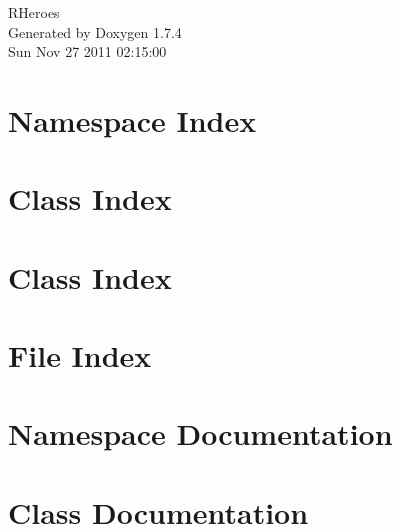 \documentclass[a4paper]{book}
\begin{document}
\hypersetup{pageanchor=false}
\begin{titlepage}
\vspace*{7cm}
\begin{center}
{\Large RHeroes }\\
\vspace*{1cm}
{\large Generated by Doxygen 1.7.4}\\
\vspace*{0.5cm}
{\small Sun Nov 27 2011 02:15:00}\\
\end{center}
\end{titlepage}
\clearemptydoublepage
{}
\tableofcontents
\clearemptydoublepage
{}
\hypersetup{pageanchor=true}
\chapter{Namespace Index}

\chapter{Class Index}

\chapter{Class Index}

\chapter{File Index}

\chapter{Namespace Documentation}

\chapter{Class Documentation}























\end{document}
